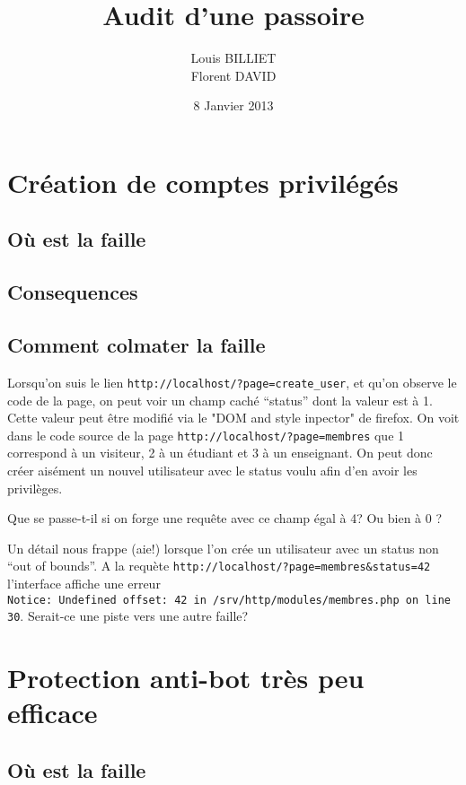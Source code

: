 \documentclass[oneside,10pt]{article}
\begin{document}
\title{Audit d'une passoire}
\author{Louis BILLIET \\ Florent DAVID}
\date{8 Janvier 2013}
\maketitle

\section{Cr\'eation de comptes privil\'eg\'es}
\subsection{O\`u est la faille}
\subsection{Consequences}
\subsection{Comment colmater la faille}
Lorsqu'on suis le lien \verb+http://localhost/?page=create_user+, et qu'on observe le code de la page, on peut voir un champ cach\'e ``status'' dont la valeur est \`a 1.
Cette valeur peut \^etre modifi\'e via le "DOM and style inpector" de firefox.
On voit dans le code source de la page \verb+http://localhost/?page=membres+ que 1 correspond \`a un visiteur, 2 \`a un \'etudiant et 3 \`a un enseignant.
On peut donc cr\'eer ais\'ement un nouvel utilisateur avec le status voulu afin d'en avoir les privil\`eges.

Que se passe-t-il si on forge une requ\^ete avec ce champ \'egal \`a 4? Ou bien \`a 0 ?

Un d\'etail nous frappe (aie!) lorsque l'on cr\'ee un utilisateur avec un status non ``out of bounds''.
A la requ\`ete \verb+http://localhost/?page=membres&status=42+ l'interface affiche une erreur \\ \verb+Notice: Undefined offset: 42 in /srv/http/modules/membres.php on line 30+.
Serait-ce une piste vers une autre faille?

\section{Protection anti-bot tr\`es peu efficace}
\subsection{O\`u est la faille}
\end{document}

